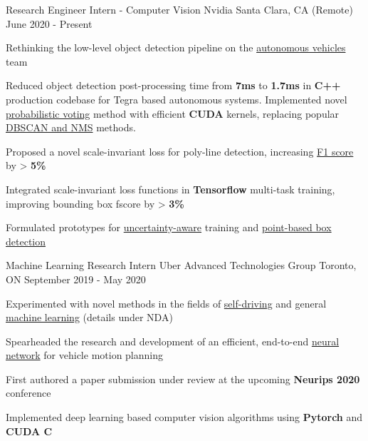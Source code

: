 
\begin{cventries}
  \cventry
    {Research Engineer Intern - Computer Vision} %
    {Nvidia} %
    {Santa Clara, CA (Remote)} %
    {June 2020 - Present} %
    {
      \begin{cvitems} %
        \item {Rethinking the low-level object detection pipeline on the \underline{autonomous vehicles} team}
        \item {Reduced object detection post-processing time from \textbf{7ms} to \textbf{1.7ms} in \textbf{C++} production codebase for Tegra based autonomous systems. Implemented novel \underline{probabilistic voting} method with efficient \textbf{CUDA} kernels, replacing popular \underline{DBSCAN and NMS} methods.}
        \item {Proposed a novel scale-invariant loss for poly-line detection, increasing \underline{F1 score} by > \textbf{5\%}}
        \item {Integrated scale-invariant loss functions in \textbf{Tensorflow} multi-task training, improving bounding box fscore by > \textbf{3\%}}
        \item {Formulated prototypes for \underline{uncertainty-aware} training and \underline{point-based box detection}}
      \end{cvitems}
    }

  \cventry
    {Machine Learning Research Intern} %
    {Uber Advanced Technologies Group} %
    {Toronto, ON} %
    {September 2019 - May 2020} %
    {
      \begin{cvitems} %
        \item {Experimented with novel methods in the fields of \underline{self-driving} and general \underline{machine learning} (details under NDA)}
        \item {Spearheaded the research and development of an efficient, end-to-end \underline{neural network} for vehicle motion planning}
        \item {First authored a paper submission under review at the upcoming \textbf{Neurips 2020} conference}
        \item {Implemented deep learning based computer vision algorithms using \textbf{Pytorch} and \textbf{CUDA C}}
      \end{cvitems}
    }


\end{cventries}

